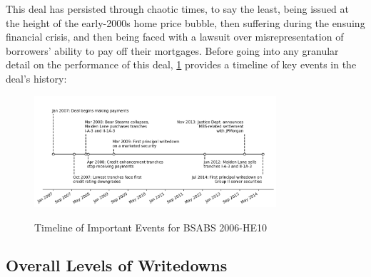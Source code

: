 \documentclass[12pt]{article}
\begin{document}
This deal has persisted through chaotic times, to say the least, being issued at the height of the early-2000s home price bubble, then suffering during the ensuing financial crisis, and then being faced with a lawsuit over misrepresentation of borrowers’ ability to pay off their mortgages. Before going into any granular detail on the performance of this deal, \ref{fig:timeline_of_important_events} provides a timeline of key events in the deal’s history:

\begin{figure}[h]
	\centering
	\caption{Timeline of Important Events for BSABS 2006-HE10}
	\includegraphics[width=0.8\textwidth]{../figures/timeline_of_important_events}
	\label{fig:timeline_of_important_events}
\end{figure}

\subsection*{Overall Levels of Writedowns}
\end{document}
